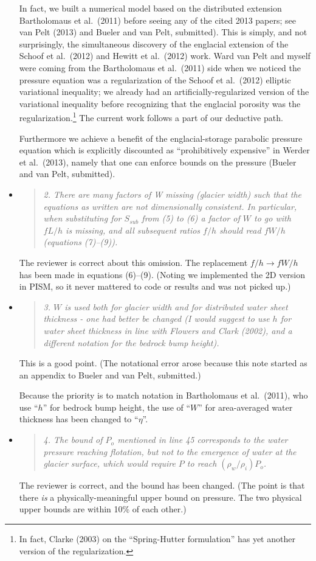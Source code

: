 \documentclass[11pt,reqno]{amsart}
\newcommand{\reply}[2]{
\medskip\medskip
\item  \begin{quote}
\emph{#1}
\end{quote}

\medskip
\noindent #2}
\begin{document}
\begin{itemize}
{In fact, we built a numerical model based on the distributed extension Bartholomaus et al.~(2011) before seeing any of the cited 2013 papers; see van Pelt (2013) and Bueler and van Pelt, submitted).  This is simply, and not surprisingly, the simultaneous discovery of the englacial extension of the Schoof et al.~(2012) and Hewitt et al.~(2012) work.  Ward van Pelt and myself were coming from the Bartholomaus et al.~(2011) side when we noticed the pressure equation was a regularization of the Schoof et al.~(2012) elliptic variational inequality; we already had an artificially-regularized version of the variational inequality before recognizing that the englacial porosity was the regularization.\footnote{In fact, Clarke (2003) on the ``Spring-Hutter formulation'' has yet another version of the regularization.}  The current work follows a part of our deductive path.

Furthermore we achieve a benefit of the englacial-storage parabolic pressure equation which is explicitly discounted as ``prohibitively expensive'' in Werder et al.~(2013), namely that one can enforce bounds on the pressure (Bueler and van Pelt, submitted).}

\reply{2. There are many factors of W missing (glacier width) such that the equations as written are not dimensionally consistent. In particular, when substituting for $S_{sub}$ from (5) to (6) a factor of $W$ to go with $f L/h$ is missing, and all subsequent ratios $f /h$ should read $f W/h$ (equations (7)--(9)).}
{The reviewer is correct about this omission.  The replacement $f/h \to fW/h$ has been made in equations (6)--(9).  (Noting we implemented the 2D version in PISM, so it never mattered to code or results and was not picked up.)}

\reply{3. $W$ is used both for glacier width and for distributed water sheet thickness - one had better be changed (I would suggest to use $h$ for water sheet thickness in line with Flowers and Clark (2002), and a different notation for the bedrock bump height).}
{This is a good point.  (The notational error arose because this note started as an appendix to Bueler and van Pelt, submitted.)

Because the priority is to match notation in Bartholomaus et al.~(2011), who use ``$h$'' for bedrock bump height, the use of ``$W$'' for area-averaged water thickness has been changed to ``$\eta$''.}

\reply{4. The bound of $P_o$ mentioned in line 45 corresponds to the water pressure reaching flotation, but not to the emergence of water at the glacier surface, which would require $P$ to reach $(\rho_w/\rho_i) P_o$.}
{The reviewer is correct, and the bound has been changed.  (The point is that there \emph{is} a physically-meaningful upper bound on pressure.  The two physical upper bounds are within 10\% of each other.)}


\end{itemize}
\end{document}
